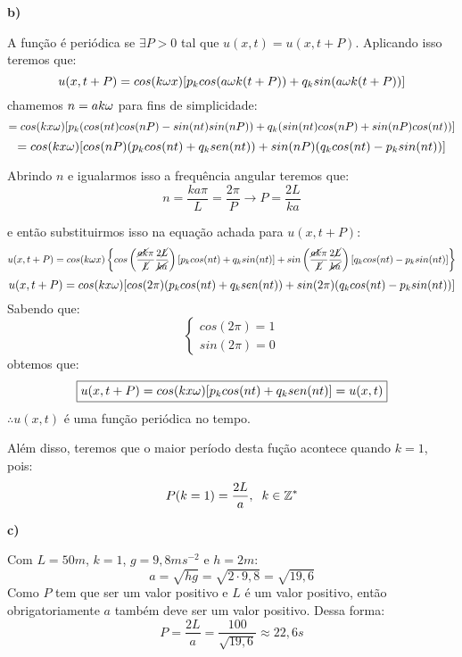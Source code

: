 \vspace{1cm}
\textbf{b)}

A função é periódica se $\exists P>0$ tal que $u(x, t) = u(x, t+P)$. Aplicando isso teremos que:
\begin{equation*}
    u(x, t+P) = cos(k\omega x)[p_kcos(a\omega k(t+P))+q_ksin(a\omega k(t+P))]
\end{equation*}
chamemos $n=ak\omega$ para fins de simplicidade:
\begin{equation*}
    = cos(kx\omega)[p_k(cos(nt)cos(nP)-sin(nt)sin(nP)) + q_k(sin(nt)cos(nP) + sin(nP)cos(nt))]
\end{equation*}
\begin{equation*}
    = cos(kx\omega)[cos(nP)(p_kcos(nt) + q_ksen(nt)) + sin(nP)(q_kcos(nt) - p_ksin(nt))]
\end{equation*}

Abrindo $n$ e igualarmos isso a frequência angular teremos que:
\begin{equation*}
    n =  \frac{ka\pi}{L} = \frac{2\pi}{P} \longrightarrow \boxed{P=\frac{2L}{ka}}
\end{equation*}

e então substituirmos isso na equação achada para $u(x, t+P)$:
\begin{equation*}
    u(x, t+P) = cos(k\omega x)\left\{cos\left(\frac{\cancel{ak}\pi}{\cancel{L}}\frac{2\cancel{L}}{\cancel{ka}}\right)[p_kcos(nt)+q_ksin(nt)] + sin\left(\frac{\cancel{ak}\pi}{\cancel{L}}\frac{2\cancel{L}}{\cancel{ka}}\right)[q_kcos(nt) - p_ksin(nt)] \right\}
\end{equation*}
\begin{equation*}
    u(x, t+P) = cos(kx\omega)[cos(2\pi)(p_kcos(nt) + q_ksen(nt)) + sin(2\pi)(q_kcos(nt) - p_ksin(nt))]
\end{equation*}
Sabendo que:
\begin{equation*}
    \begin{cases}
        cos(2\pi) = 1\\
        sin(2\pi) = 0
    \end{cases}    
\end{equation*}
obtemos que:
\begin{equation*}
    \boxed{u(x, t+P) = cos(kx\omega)[p_kcos(nt) + q_ksen(nt)] = u(x, t)}
\end{equation*}
$\therefore u(x, t)$ é uma função periódica no tempo. 

Além disso, teremos que o maior período desta fução acontece quando $k=1$, pois:
\begin{equation*}
    P(k=1) = \frac{2L}{a}, \hspace{0.2cm} k\in\mathbb{Z}^*
\end{equation*}

\textbf{c)}

Com $L=50m$, $k=1$, $g=9,8ms^{-2}$ e $h=2m$:
\begin{equation*}
    a = \sqrt{hg} = \sqrt{2\cdot 9,8} = \sqrt{19,6}
\end{equation*}
Como $P$ tem que ser um valor positivo e $L$ é um valor positivo, então obrigatoriamente $a$ também deve ser um valor positivo. Dessa forma:
\begin{equation*}
    P = \frac{2L}{a} = \frac{100}{\sqrt{19,6}} \approx 22,6s
\end{equation*}